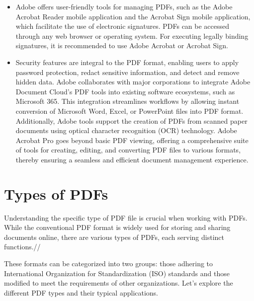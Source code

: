 \begin{itemize}
  \item Adobe offers user-friendly tools for managing PDFs, such as the Adobe Acrobat Reader mobile application and the Acrobat Sign mobile application, which facilitate the use of electronic signatures. PDFs can be accessed through any web browser or operating system. For executing legally binding signatures, it is recommended to use Adobe Acrobat or Acrobat Sign.

  \item Security features are integral to the PDF format, enabling users to apply password protection, redact sensitive information, and detect and remove hidden data. Adobe collaborates with major corporations to integrate Adobe Document Cloud’s PDF tools into existing software ecosystems, such as Microsoft 365. This integration streamlines workflows by allowing instant conversion of Microsoft Word, Excel, or PowerPoint files into PDF format. Additionally, Adobe tools support the creation of PDFs from scanned paper documents using optical character recognition (OCR) technology. Adobe Acrobat Pro goes beyond basic PDF viewing, offering a comprehensive suite of tools for creating, editing, and converting PDF files to various formats, thereby ensuring a seamless and efficient document management experience.

\end{itemize}


\section{Types of PDFs}

Understanding the specific type of PDF file is crucial when working with PDFs. While the conventional PDF format is widely used for storing and sharing documents online, there are various types of PDFs, each serving distinct functions.//

These formats can be categorized into two groups: those adhering to International Organization for Standardization (ISO) standards and those modified to meet the requirements of other organizations. Let's explore the different PDF types and their typical applications.

